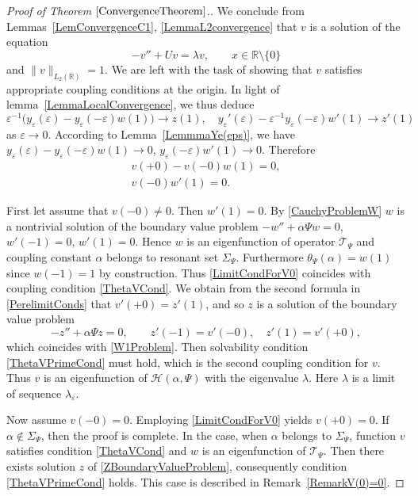 \documentclass[11pt,english]{amsart}
\begin{document}
\begin{proof}[Proof of  Theorem $\ref{ConvergenceTheorem}$.]
We conclude from Lemmas~\ref{LemConvergenceC1}, \ref{LemmaL2convergence} that  $v$ is a solution of the equation
\begin{equation*}
    -v''+Uv=\lambda v,\qquad x\in \mathbb{R}\setminus\{0\}
\end{equation*}
and $\|v\|_{L_2(\mathbb R)}=1$. We are left with the task of showing that $v$ satisfies appropriate coupling conditions at the origin.
In light of lemma~\ref{LemmaLocalConvergence}, we thus deduce
\begin{equation}\label{PerelimitConds}
    \varepsilon^{-1}\bigl(y_\varepsilon(\varepsilon)-y_\varepsilon(-\varepsilon)w(1)\bigl)\to z(1),\quad
    y_\varepsilon'(\varepsilon)-\varepsilon^{-1}y_\varepsilon(-\varepsilon)w'(1)\to z'(1)
\end{equation}
as $\varepsilon\to 0$. According to Lemma~\ref{LemmmaYe(eps)}, we have $y_\varepsilon(\varepsilon)-y_\varepsilon(-\varepsilon)w(1)\to 0$, $y_\varepsilon(-\varepsilon)w'(1)\to 0$. Therefore
\begin{gather}\label{LimitCondForV0}
    v(+0)-v(-0)w(1)=0,\\\label{LimitCondForV1}
    v(-0)w'(1)=0.
\end{gather}

First let assume that $v(-0)\neq 0$. Then $w'(1)=0$. By \eqref{CauchyProblemW}  $w$ is a nontrivial solution of the boundary value problem $-w''+\alpha\Psi w=0$, $w'(-1)=0$, $w'(1)=0$. Hence $w$ is an eigenfunction of operator $\mathcal{T}_\Psi$ and coupling constant $\alpha$ belongs to  resonant set $\Sigma_\Psi$. Furthermore $\theta_\Psi (\alpha)=w(1)$ since $w(-1)=1$ by construction. Thus \eqref{LimitCondForV0} coincides with coupling condition \eqref{ThetaVCond}. We obtain from the second formula in  \eqref{PerelimitConds} that $v'(+0)=z'(1)$, and so $z$ is a solution of the boundary value problem
\begin{equation}\label{ZBoundaryValueProblem}
    -z''+\alpha\Psi z=0,\qquad z'(-1)=v'(-0),\quad z'(1)=v'(+0),
\end{equation}
which coincides with \eqref{W1Problem}.
Then  solvability condition  \eqref{ThetaVPrimeCond} must hold, which is the second coupling condition for $v$.
Thus $v$ is an eigenfunction of $\mathcal{H}(\alpha,\Psi)$ with the eigenvalue $\lambda$. Here $\lambda$ is a limit of sequence $\lambda_\varepsilon$.

Now assume $v(-0)=0$. Employing \eqref{LimitCondForV0} yields $v(+0)=0$. If $\alpha\not\in \Sigma_\Psi$, then the proof is complete. In the case, when
$\alpha$ belongs to $\Sigma_\Psi$, function $v$ satisfies  condition \eqref{ThetaVCond}  and $w$  is an eigenfunction of  $\mathcal{T}_\Psi$. Then there exists  solution $z$  of \eqref{ZBoundaryValueProblem}, consequently
 condition \eqref{ThetaVPrimeCond} holds.
This case is described in Remark~\ref{RemarkV(0)=0}.
\end{proof}
\end{document}
